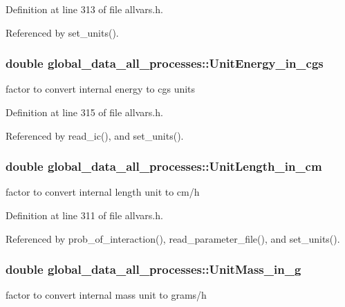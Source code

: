 Definition at line 313 of file allvars.h.



Referenced by set\_\-units().

\hypertarget{structglobal__data__all__processes_ab0d48e2253ad31d76eda8e677eba2cf1}{
\subsubsection[{UnitEnergy\_\-in\_\-cgs}]{\setlength{\rightskip}{0pt plus 5cm}double {\bf global\_\-data\_\-all\_\-processes::UnitEnergy\_\-in\_\-cgs}}}
\label{structglobal__data__all__processes_ab0d48e2253ad31d76eda8e677eba2cf1}
factor to convert internal energy to cgs units 

Definition at line 315 of file allvars.h.



Referenced by read\_\-ic(), and set\_\-units().

\hypertarget{structglobal__data__all__processes_a111a45896aafd67faa8f0c9ef897612f}{
\subsubsection[{UnitLength\_\-in\_\-cm}]{\setlength{\rightskip}{0pt plus 5cm}double {\bf global\_\-data\_\-all\_\-processes::UnitLength\_\-in\_\-cm}}}
\label{structglobal__data__all__processes_a111a45896aafd67faa8f0c9ef897612f}
factor to convert internal length unit to cm/h 

Definition at line 311 of file allvars.h.



Referenced by prob\_\-of\_\-interaction(), read\_\-parameter\_\-file(), and set\_\-units().

\hypertarget{structglobal__data__all__processes_adccf5aa82d4252d8d24ead7681b29052}{
\subsubsection[{UnitMass\_\-in\_\-g}]{\setlength{\rightskip}{0pt plus 5cm}double {\bf global\_\-data\_\-all\_\-processes::UnitMass\_\-in\_\-g}}}
\label{structglobal__data__all__processes_adccf5aa82d4252d8d24ead7681b29052}
factor to convert internal mass unit to grams/h 

